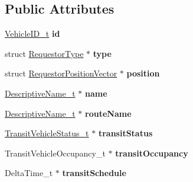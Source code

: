 \subsection*{Public Attributes}
\begin{DoxyCompactItemize}
\item 
\hyperlink{structVehicleID}{Vehicle\+I\+D\+\_\+t} {\bfseries id}\hypertarget{structRequestorDescription_aeacc857bcb8bbc386ba875e22658cd78}{}\label{structRequestorDescription_aeacc857bcb8bbc386ba875e22658cd78}

\item 
struct \hyperlink{structRequestorType}{Requestor\+Type} $\ast$ {\bfseries type}\hypertarget{structRequestorDescription_a1e17a26c87855d817aed5648722b3923}{}\label{structRequestorDescription_a1e17a26c87855d817aed5648722b3923}

\item 
struct \hyperlink{structRequestorPositionVector}{Requestor\+Position\+Vector} $\ast$ {\bfseries position}\hypertarget{structRequestorDescription_a91405e27cd08f4896e644e19c2216134}{}\label{structRequestorDescription_a91405e27cd08f4896e644e19c2216134}

\item 
\hyperlink{structOCTET__STRING}{Descriptive\+Name\+\_\+t} $\ast$ {\bfseries name}\hypertarget{structRequestorDescription_ac7565ca0a76613e0b17056ef98f47d35}{}\label{structRequestorDescription_ac7565ca0a76613e0b17056ef98f47d35}

\item 
\hyperlink{structOCTET__STRING}{Descriptive\+Name\+\_\+t} $\ast$ {\bfseries route\+Name}\hypertarget{structRequestorDescription_a331743032bc41082ebcaeb4f73d99f80}{}\label{structRequestorDescription_a331743032bc41082ebcaeb4f73d99f80}

\item 
\hyperlink{structBIT__STRING__s}{Transit\+Vehicle\+Status\+\_\+t} $\ast$ {\bfseries transit\+Status}\hypertarget{structRequestorDescription_a9c134588156b77488d5d051bc02cadd4}{}\label{structRequestorDescription_a9c134588156b77488d5d051bc02cadd4}

\item 
Transit\+Vehicle\+Occupancy\+\_\+t $\ast$ {\bfseries transit\+Occupancy}\hypertarget{structRequestorDescription_afd4ed16741a26342adc1c5733b8dfc90}{}\label{structRequestorDescription_afd4ed16741a26342adc1c5733b8dfc90}

\item 
Delta\+Time\+\_\+t $\ast$ {\bfseries transit\+Schedule}\hypertarget{structRequestorDescription_a32c76d32b83ff2ebf404f150a0e285d5}{}\label{structRequestorDescription_a32c76d32b83ff2ebf404f150a0e285d5}


\end{DoxyCompactItemize}
